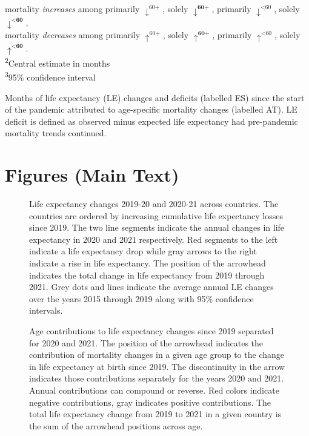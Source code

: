 \documentclass[12pt]{article}
\begin{document}
\begin{table}[ht]
\begin{minipage}{\linewidth}
    mortality \emph{increases} among
    {primarily $\downarrow^{\text{60+}}$},
    {solely $\downarrow^{\textbf{60+}}$},
    {primarily $\downarrow^{\text{<60}}$},
    {solely $\downarrow^{\textbf{<60}}$}, \\
    mortality \emph{decreases} among
    {primarily $\uparrow^{\text{60+}}$},
    {solely $\uparrow^{\textbf{60+}}$},
    {primarily $\uparrow^{\text{<60}}$},
    {solely $\uparrow^{\textbf{<60}}$}. \\
    \textsuperscript{2}Central estimate in months \\
    \textsuperscript{3}95\% confidence interval \\
    \end{minipage}
    \caption{Months of life expectancy (LE) changes and deficits (labelled ES) since the start of the pandemic attributed to age-specific mortality changes (labelled AT). LE deficit is defined as observed minus expected life expectancy had pre-pandemic mortality trends continued.}
    \label{tab:arriaga}
    \end{table}

\clearpage
\section*{Figures (Main Text)}

\begin{figure}[ht!]
    \centering
    \caption{Life expectancy changes 2019-20 and 2020-21 across countries. The countries are ordered by increasing cumulative life expectancy losses since 2019. The two line segments indicate the annual changes in life expectancy in 2020 and 2021 respectively. Red segments to the left indicate a life expectancy drop while gray arrows to the right indicate a rise in life expectancy. The position of the arrowhead indicates the total change in life expectancy from 2019 through 2021.
    Grey dots and lines indicate the average annual LE changes over the years 2015 through 2019 along with 95\% confidence intervals.}
    \label{fig:figure-1}
\end{figure}

\begin{figure}[ht!]
    \centering
    \caption{Age contributions to life expectancy changes since 2019 separated for 2020 and 2021. The position of the arrowhead indicates the contribution of mortality changes in a given age group to the change in life expectancy at birth since 2019. The discontinuity in the arrow indicates those contributions separately for the years 2020 and 2021. Annual contributions can compound or reverse. Red colors indicate negative contributions, gray indicates positive contributions. The total life expectancy change from 2019 to 2021 in a given country is the sum of the arrowhead positions across age.}
    \label{fig:figure-2}
\end{figure}
\end{document}
